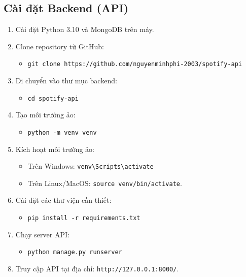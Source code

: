 \subsection{Cài đặt Backend (API)}
\begin{enumerate}
    \item Cài đặt Python 3.10 và MongoDB trên máy.
    \item Clone repository từ GitHub:
    \begin{itemize}
        \item \texttt{git clone https://github.com/nguyenminhphi-2003/spotify-api}
    \end{itemize}
    \item Di chuyển vào thư mục backend:
    \begin{itemize}
        \item \texttt{cd spotify-api}
    \end{itemize}
    \item Tạo môi trường ảo:
    \begin{itemize}
        \item \texttt{python -m venv venv}
    \end{itemize}
    \item Kích hoạt môi trường ảo:
    \begin{itemize}
        \item Trên Windows: \texttt{venv\textbackslash Scripts\textbackslash activate}
        \item Trên Linux/MacOS: \texttt{source venv/bin/activate}.
    \end{itemize}
    \item Cài đặt các thư viện cần thiết:
    \begin{itemize}
        \item \texttt{pip install -r requirements.txt}
    \end{itemize}
    \item Chạy server API:
    \begin{itemize}
        \item \texttt{python manage.py runserver}
    \end{itemize}
    \item Truy cập API tại địa chỉ: \texttt{http://127.0.0.1:8000/}.
\end{enumerate}

